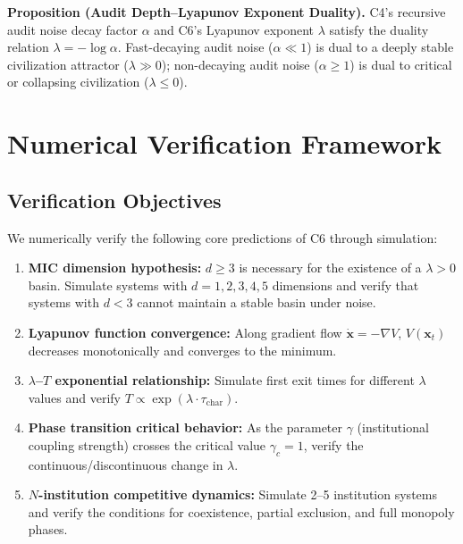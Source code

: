 \documentclass[12pt,a4paper]{article}
\theoremstyle{definition}
\newcommand{\lb}{\lambda}
\newcommand{\Lyap}{V}
\newcommand{\grad}{\nabla}
\begin{document}
\noindent
\textbf{Proposition (Audit Depth--Lyapunov Exponent Duality).}
C4's recursive audit noise decay factor $\alpha$ and C6's Lyapunov exponent $\lb$ satisfy the duality relation $\lb = -\log \alpha$. Fast-decaying audit noise ($\alpha \ll 1$) is dual to a deeply stable civilization attractor ($\lb \gg 0$); non-decaying audit noise ($\alpha \geq 1$) is dual to critical or collapsing civilization ($\lb \leq 0$).

\section{Numerical Verification Framework}
\label{sec:numerical}

\subsection{Verification Objectives}
\label{sec:verify_objectives}

\noindent
We numerically verify the following core predictions of C6 through simulation:

\begin{enumerate}[label=\textbf{V\arabic*}, leftmargin=*]
    \item \textbf{MIC dimension hypothesis:} $d \geq 3$ is necessary for the existence of a $\lb>0$ basin. Simulate systems with $d=1,2,3,4,5$ dimensions and verify that systems with $d<3$ cannot maintain a stable basin under noise.
    \item \textbf{Lyapunov function convergence:} Along gradient flow $\dot{\mathbf{x}} = -\grad \Lyap$, $\Lyap(\mathbf{x}_t)$ decreases monotonically and converges to the minimum.
    \item \textbf{$\lb$--$T$ exponential relationship:} Simulate first exit times for different $\lb$ values and verify $T \propto \exp(\lb \cdot \tau_{\text{char}})$.
    \item \textbf{Phase transition critical behavior:} As the parameter $\gamma$ (institutional coupling strength) crosses the critical value $\gamma_c = 1$, verify the continuous/discontinuous change in $\lb$.
    \item \textbf{$N$-institution competitive dynamics:} Simulate 2--5 institution systems and verify the conditions for coexistence, partial exclusion, and full monopoly phases.
\end{enumerate}
\end{document}
